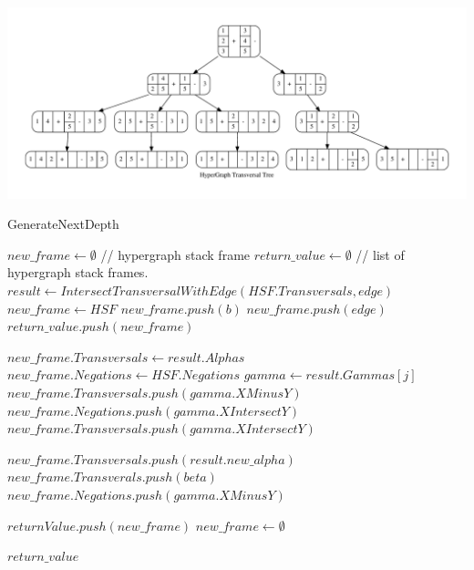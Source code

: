 \includegraphics[scale=.4]{Paper.pdf}

\begin{algorithm}
	\caption{GenerateNextDepth}\label{GenerateNextDepth}
	\begin{algorithmic}[1]
		\State $new\_frame \gets \emptyset $ // hypergraph stack frame
		\State $return\_value \gets \emptyset $  // list of hypergraph stack frames.
		\State $result \gets IntersectTransversalWithEdge(HSF.Transversals,edge)$
		\State $new\_frame \gets HSF$ 
		\State $new\_frame.push(b)$    
		\EndFor
		\Else
		\State $new\_frame.push(edge)$ 
		\EndIf
		\State $return\_value.push(new\_frame)$
		\EndIf
		\Else
		
			\State $new\_frame.Transversals \gets result.Alphas$
			\State $new\_frame.Negations \gets HSF.Negations$ 
				\State $gamma \gets result.Gammas[j]$
					\State $new\_frame.Transversals.push(gamma.XMinusY)$
					\State $new\_frame.Negations.push(gamma.XIntersectY)$
				\Else
					\State $new\_frame.Transversals.push(gamma.XIntersectY)$
				\EndIf
	
			\EndFor
				\State $new\_frame.Transversals.push(result.new\_alpha)$
				\EndIf
			\Else 
				\State $new\_frame.Transverals.push(beta)$
				\EndFor 
				\State $new\_frame.Negations.push(gamma.XMinusY)$
				\EndFor 
				\EndIf
			
			\EndIf
		\State $returnValue.push(new\_frame)$
		\State $new\_frame \gets \emptyset$
		\EndIf
		
		\EndFor
		\EndIf
		\State \Return $return\_value$
		\EndFunction
	\end{algorithmic}
\end{algorithm}



